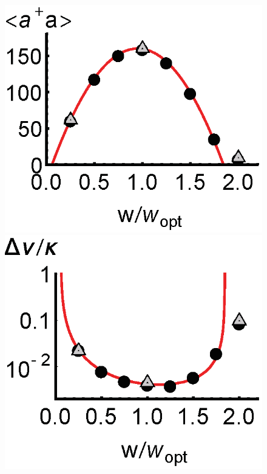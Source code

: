 \documentclass[aps,
twocolumn,
showpacs,
superscriptaddress,groupedaddress]{revtex4}
\begin{document}
\begin{figure}
\begin{center}
	\hspace{-5.0mm} \includegraphics[scale =0.38] {N40Laserada.eps}
	\hspace{-5.0mm} \includegraphics[scale =0.38] {N40LaserLW.eps}

\end{center}
\end{figure}
\end{document}
